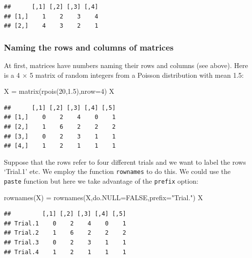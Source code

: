 \documentclass[
]{book}
\newenvironment{Shaded}{\begin{snugshade}}{\end{snugshade}}
\newcommand{\AttributeTok}[1]{\textcolor[rgb]{0.77,0.63,0.00}{#1}}
\newcommand{\ConstantTok}[1]{\textcolor[rgb]{0.00,0.00,0.00}{#1}}
\newcommand{\DecValTok}[1]{\textcolor[rgb]{0.00,0.00,0.81}{#1}}
\newcommand{\FloatTok}[1]{\textcolor[rgb]{0.00,0.00,0.81}{#1}}
\newcommand{\FunctionTok}[1]{\textcolor[rgb]{0.00,0.00,0.00}{#1}}
\newcommand{\NormalTok}[1]{#1}
\newcommand{\OtherTok}[1]{\textcolor[rgb]{0.56,0.35,0.01}{#1}}
\newcommand{\StringTok}[1]{\textcolor[rgb]{0.31,0.60,0.02}{#1}}
\theoremstyle{definition}
\theoremstyle{definition}
\theoremstyle{definition}
\theoremstyle{definition}
\theoremstyle{remark}
\begin{document}
\begin{verbatim}
##      [,1] [,2] [,3] [,4]
## [1,]    1    2    3    4
## [2,]    4    3    2    1
\end{verbatim}

\hypertarget{naming-the-rows-and-columns-of-matrices}{%
\subsubsection{Naming the rows and columns of matrices}\label{naming-the-rows-and-columns-of-matrices}}

At first, matrices have numbers naming their rows and columns (see above). Here is a 4 × 5 matrix of random integers from a Poisson distribution with mean 1.5:

\begin{Shaded}
\begin{Highlighting}[]
\NormalTok{X }\OtherTok{=} \FunctionTok{matrix}\NormalTok{(}\FunctionTok{rpois}\NormalTok{(}\DecValTok{20}\NormalTok{,}\FloatTok{1.5}\NormalTok{),}\AttributeTok{nrow=}\DecValTok{4}\NormalTok{)}
\NormalTok{X}
\end{Highlighting}
\end{Shaded}

\begin{verbatim}
##      [,1] [,2] [,3] [,4] [,5]
## [1,]    0    2    4    0    1
## [2,]    1    6    2    2    2
## [3,]    0    2    3    1    1
## [4,]    1    2    1    1    1
\end{verbatim}

Suppose that the rows refer to four different trials and we want to label the rows `Trial.1' etc. We employ the function \texttt{rownames} to do this. We could use the \texttt{paste} function but here we take advantage of the \texttt{prefix} option:

\begin{Shaded}
\begin{Highlighting}[]
\FunctionTok{rownames}\NormalTok{(X) }\OtherTok{=} \FunctionTok{rownames}\NormalTok{(X,}\AttributeTok{do.NULL=}\ConstantTok{FALSE}\NormalTok{,}\AttributeTok{prefix=}\StringTok{"Trial."}\NormalTok{)}
\NormalTok{X}
\end{Highlighting}
\end{Shaded}

\begin{verbatim}
##         [,1] [,2] [,3] [,4] [,5]
## Trial.1    0    2    4    0    1
## Trial.2    1    6    2    2    2
## Trial.3    0    2    3    1    1
## Trial.4    1    2    1    1    1
\end{verbatim}
\end{document}
